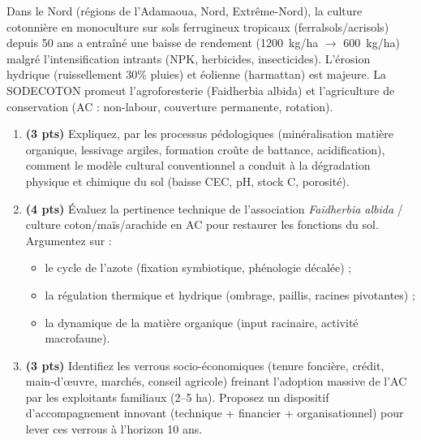 \documentclass[11pt]{article}
\begin{document}
\begin{exercice}
Dans le Nord (régions de l'Adamaoua, Nord, Extrême-Nord), la culture cotonnière en monoculture sur sols ferrugineux tropicaux (ferralsols/acrisols) depuis 50 ans a entraîné une baisse de rendement (\SI{1200}{\kilo\gram/ha} $\to$ \SI{600}{\kilo\gram/ha}) malgré l'intensification intrants (NPK, herbicides, insecticides). L'érosion hydrique (ruissellement 30\% pluies) et éolienne (harmattan) est majeure. La SODECOTON promeut l'agroforesterie (Faidherbia albida) et l'agriculture de conservation (AC : non-labour, couverture permanente, rotation).

\begin{enumerate}
    \item \textbf{(3 pts)} Expliquez, par les processus pédologiques (minéralisation matière organique, lessivage argiles, formation croûte de battance, acidification), comment le modèle cultural conventionnel a conduit à la dégradation physique et chimique du sol (baisse CEC, pH, stock C, porosité).

    \item \textbf{(4 pts)} Évaluez la pertinence technique de l'association \textit{Faidherbia albida} / culture coton/maïs/arachide en AC pour restaurer les fonctions du sol. Argumentez sur : 
    \begin{itemize}
        \item le cycle de l'azote (fixation symbiotique, phénologie décalée) ;
        \item la régulation thermique et hydrique (ombrage, paillis, racines pivotantes) ;
        \item la dynamique de la matière organique (input racinaire, activité macrofaune).
    \end{itemize}

    \item \textbf{(3 pts)} Identifiez les verrous socio-économiques (tenure foncière, crédit, main-d'œuvre, marchés, conseil agricole) freinant l'adoption massive de l'AC par les exploitants familiaux (2--5 ha). Proposez un dispositif d'accompagnement innovant (technique + financier + organisationnel) pour lever ces verrous à l'horizon 10 ans.
\end{enumerate}
\end{exercice}
\end{document}
